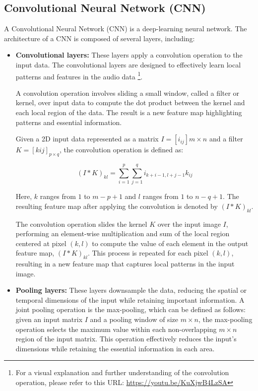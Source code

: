 

\subsection{Convolutional Neural Network (CNN)}

A Convolutional Neural Network (CNN) is a deep-learning neural network. The architecture of a CNN is composed of several layers, including:

\begin{itemize}

\item \textbf{Convolutional layers:} These layers apply a convolution operation to the input data. The convolutional layers are designed to effectively learn local patterns and features in the audio data \footnote{For a visual explanation and further understanding of the convolution operation, please refer to this URL: \url{https://youtu.be/KuXjwB4LzSA}}.

A convolution operation involves sliding a small window, called a filter or kernel, over input data to compute the dot product between the kernel and each local region of the data. The result is a new feature map highlighting patterns and essential information.

Given a 2D input data represented as a matrix $I = [i_{ij}]{m \times n}$ and a filter $K = [k{ij}]_{p \times q}$, the convolution operation is defined as:

\begin{equation}
    (I * K)_{kl} = \sum_{i=1}^{p} \sum_{j=1}^{q} i_{k+i-1, l+j-1}k_{ij}
\end{equation}

Here, $k$ ranges from $1$ to $m-p+1$ and $l$ ranges from $1$ to $n-q+1$. The resulting feature map after applying the convolution is denoted by $(I * K)_{kl}$.

The convolution operation slides the kernel $K$ over the input image $I$, performing an element-wise multiplication and sum of the local region centered at pixel $(k,l)$ to compute the value of each element in the output feature map, $(I * K)_{kl}$. This process is repeated for each pixel $(k,l)$, resulting in a new feature map that captures local patterns in the input image.




\item \textbf{Pooling layers:} These layers downsample the data, reducing the spatial or temporal dimensions of the input while retaining important information. A joint pooling operation is the max-pooling, which can be defined as follows: given an input matrix $I$ and a pooling window of size $m \times n$, the max-pooling operation selects the maximum value within each non-overlapping $m \times n$ region of the input matrix. This operation effectively reduces the input's dimensions while retaining the essential information in each area.
\vspace*{3mm}


\end{itemize}

